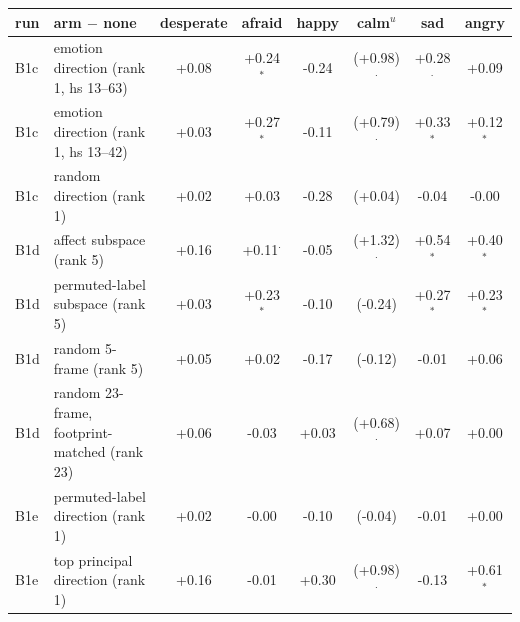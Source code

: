 \begin{tabular}{llcccccc}\toprule
run & arm $-$ none & desperate & afraid & happy & calm$^{u}$ & sad & angry \\ \midrule
B1c & emotion direction (rank 1, hs 13--63) & +0.08 & +0.24$^{*}$ & -0.24 & (+0.98)$^{\cdot}$ & +0.28$^{\cdot}$ & +0.09 \\
B1c & emotion direction (rank 1, hs 13--42) & +0.03 & +0.27$^{*}$ & -0.11 & (+0.79)$^{\cdot}$ & +0.33$^{*}$ & +0.12$^{*}$ \\
B1c & random direction (rank 1) & +0.02 & +0.03 & -0.28 & (+0.04) & -0.04 & -0.00 \\
B1d & affect subspace (rank 5) & +0.16 & +0.11$^{\cdot}$ & -0.05 & (+1.32)$^{\cdot}$ & +0.54$^{*}$ & +0.40$^{*}$ \\
B1d & permuted-label subspace (rank 5) & +0.03 & +0.23$^{*}$ & -0.10 & (-0.24) & +0.27$^{*}$ & +0.23$^{*}$ \\
B1d & random 5-frame (rank 5) & +0.05 & +0.02 & -0.17 & (-0.12) & -0.01 & +0.06 \\
B1d & random 23-frame, footprint-matched (rank 23) & +0.06 & -0.03 & +0.03 & (+0.68)$^{\cdot}$ & +0.07 & +0.00 \\
B1e & permuted-label direction (rank 1) & +0.02 & -0.00 & -0.10 & (-0.04) & -0.01 & +0.00 \\
B1e & top principal direction (rank 1) & +0.16 & -0.01 & +0.30 & (+0.98)$^{\cdot}$ & -0.13 & +0.61$^{*}$ \\
\bottomrule\end{tabular}